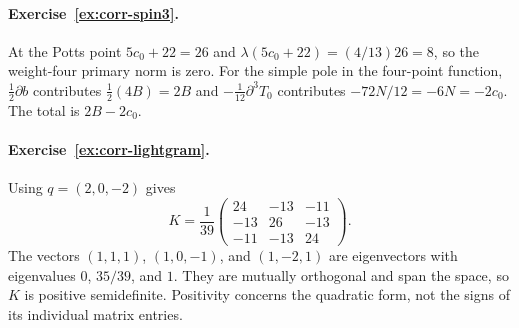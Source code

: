 \paragraph{Exercise~\ref{ex:corr-spin3}.}
\label{sol:ex:corr-spin3}
At the Potts point $5c_0+22=26$ and
$\lambda(5c_0+22)=(4/13)26=8$, so the weight-four
primary norm is zero. For the simple pole in the four-point
function, $\frac12\partial b$ contributes
$\frac12(4B)=2B$ and
$-\frac1{12}\partial^3T_0$ contributes
$-72N/12=-6N=-2c_0$.
The total is $2B-2c_0$.



\paragraph{Exercise~\ref{ex:corr-lightgram}.}
\label{sol:ex:corr-lightgram}
Using $q=(2,0,-2)$ gives
\[
 K=\frac1{39}
 \begin{pmatrix}
 24&-13&-11\\
 -13&26&-13\\
 -11&-13&24
 \end{pmatrix}.
\]
The vectors $(1,1,1)$, $(1,0,-1)$, and $(1,-2,1)$
are eigenvectors with eigenvalues $0$, $35/39$, and $1$.
They are mutually orthogonal and span the space, so $K$
is positive semidefinite. Positivity concerns the quadratic
form, not the signs of its individual matrix entries.


